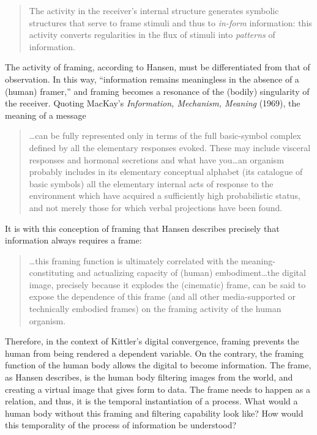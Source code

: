 \begin{quote}
	The activity in the receiver's internal structure generates symbolic structures that serve to frame stimuli and thus to \textit{in-form} information: this activity converts regularities in the flux of stimuli into \textit{patterns} of information. \parencite[76]{Han02:Cin}
\end{quote}

The activity of framing, according to Hansen, must be differentiated from that of observation. In this way, ``information remains meaningless in the absence of a (human) framer,'' \parencite[77]{Han02:Cin} and framing becomes a resonance of the (bodily) singularity of the receiver. Quoting MacKay's \textit{Information, Mechanism, Meaning} (1969), the meaning of a message

\begin{quote}
	\dots can be fully represented only in terms of the full basic-symbol complex defined by all the elementary responses evoked. These may include visceral responses and hormonal secretions and what have you\dots an organism probably includes in its elementary conceptual alphabet (its catalogue of basic symbols) all the elementary internal acts of response to the environment which have acquired a sufficiently high probabilistic status, and not merely those for which verbal projections have been found. \parencite[78]{Han02:Cin}
\end{quote}

It is with this conception of framing that Hansen describes precisely that information always requires a frame:

\begin{quote}
	\dots this framing function is ultimately correlated with the meaning-constituting and actualizing capacity of (human) embodiment\dots the digital image, precisely because it explodes the (cinematic) frame, can be said to expose the dependence of this frame (and all other media-supported or technically embodied frames) on the framing activity of the human organism. \parencite[89-90]{Han02:Cin}
\end{quote}

Therefore, in the context of Kittler's digital convergence, framing prevents the human from being rendered a dependent variable. On the contrary, the framing function of the human body allows the digital to become information. The frame, as Hansen describes, is the human body filtering images from the world, and creating a virtual image that gives form to data. The frame needs to happen as a relation, and thus, it is the temporal instantiation of a process. What would a human body without this framing and filtering capability look like? How would this temporality of the process of information be understood? 

